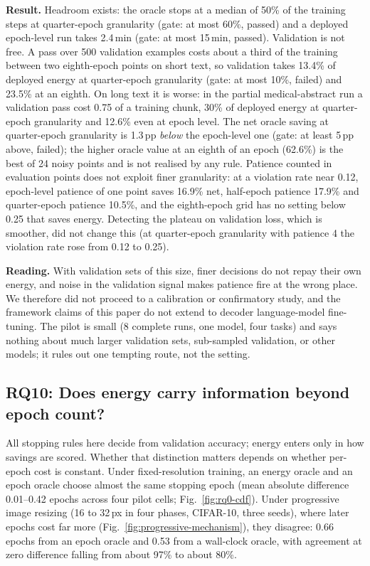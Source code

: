 \documentclass[3p,twocolumn,10pt]{elsarticle}
\theoremstyle{definition}
\begin{document}
\textbf{Result.} Headroom exists: the oracle stops at a median of 50\% of the training steps at quarter-epoch granularity (gate: at most 60\%, passed) and a deployed epoch-level run takes 2.4\,min (gate: at most 15\,min, passed). Validation is not free. A pass over 500 validation examples costs about a third of the training between two eighth-epoch points on short text, so validation takes 13.4\% of deployed energy at quarter-epoch granularity (gate: at most 10\%, failed) and 23.5\% at an eighth. On long text it is worse: in the partial medical-abstract run a validation pass cost 0.75 of a training chunk, 30\% of deployed energy at quarter-epoch granularity and 12.6\% even at epoch level. The net oracle saving at quarter-epoch granularity is 1.3\,pp \emph{below} the epoch-level one (gate: at least 5\,pp above, failed); the higher oracle value at an eighth of an epoch (62.6\%) is the best of 24 noisy points and is not realised by any rule. Patience counted in evaluation points does not exploit finer granularity: at a violation rate near 0.12, epoch-level patience of one point saves 16.9\% net, half-epoch patience 17.9\% and quarter-epoch patience 10.5\%, and the eighth-epoch grid has no setting below 0.25 that saves energy. Detecting the plateau on validation loss, which is smoother, did not change this (at quarter-epoch granularity with patience 4 the violation rate rose from 0.12 to 0.25).

\textbf{Reading.} With validation sets of this size, finer decisions do not repay their own energy, and noise in the validation signal makes patience fire at the wrong place. We therefore did not proceed to a calibration or confirmatory study, and the framework claims of this paper do not extend to decoder language-model fine-tuning. The pilot is small (8 complete runs, one model, four tasks) and says nothing about much larger validation sets, sub-sampled validation, or other models; it rules out one tempting route, not the setting.

\subsection{RQ10: Does energy carry information beyond epoch count?}
\label{sec:rq6}
All stopping rules here decide from validation accuracy; energy enters only in how savings are scored. Whether that distinction matters depends on whether per-epoch cost is constant. Under fixed-resolution training, an energy oracle and an epoch oracle choose almost the same stopping epoch (mean absolute difference 0.01--0.42 epochs across four pilot cells; Fig.~\ref{fig:rq0-cdf}). Under progressive image resizing (16 to 32\,px in four phases, CIFAR-10, three seeds), where later epochs cost far more (Fig.~\ref{fig:progressive-mechanism}), they disagree: 0.66 epochs from an epoch oracle and 0.53 from a wall-clock oracle, with agreement at zero difference falling from about 97\% to about 80\%.
\end{document}
